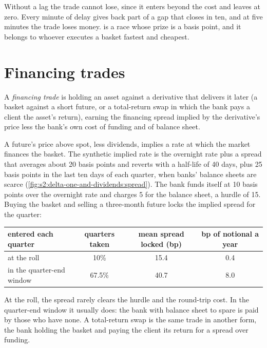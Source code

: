 Without a lag the trade cannot lose, since it enters beyond the cost and leaves at zero. Every minute of delay gives back part of a gap that closes in
ten, and at five minutes the trade loses money.  is a race whose prize is a basis point, and it belongs to whoever executes a basket
fastest and cheapest.

\section{Financing trades}

\begin{definition}\label{def:s2:delta-one-and-dividends:financing}
A \emph{financing trade} is holding an asset against a derivative that delivers it later (a basket against a short future, or a
total-return swap in which the bank pays a client the asset's return), earning the financing spread implied by the derivative's price less the
bank's own cost of funding and of balance sheet.
\end{definition}

A future's price above spot, less dividends, implies a rate at which the market finances the basket. The synthetic implied rate is the overnight rate
plus a spread that averages about 20 basis points and reverts with a half-life of 40 days, plus 25 basis points in the last ten days of each quarter,
when banks' balance sheets are scarce (\cref{fig:s2:delta-one-and-dividends:spread}). The bank funds itself at 10 basis points over the overnight rate
and charges 5 for the balance sheet, a hurdle of 15. Buying the basket and selling a three-month future locks the implied spread for the quarter:

\begin{center}
\small
\begin{tabular}{@{}lccc@{}}
\toprule
entered each quarter & quarters taken & mean spread locked (bp) & bp of notional a year\\
\midrule
at the roll & 10\% & 15.4 & 0.4\\
in the quarter-end window & 67.5\% & 40.7 & 8.0\\
\bottomrule
\end{tabular}
\end{center}

At the roll, the spread rarely clears the hurdle and the round-trip cost. In the quarter-end window it usually does: the bank with balance sheet to spare
is paid by those who have none. A total-return swap is the same trade in another form, the bank holding the basket and paying the client its
return for a spread over funding.


